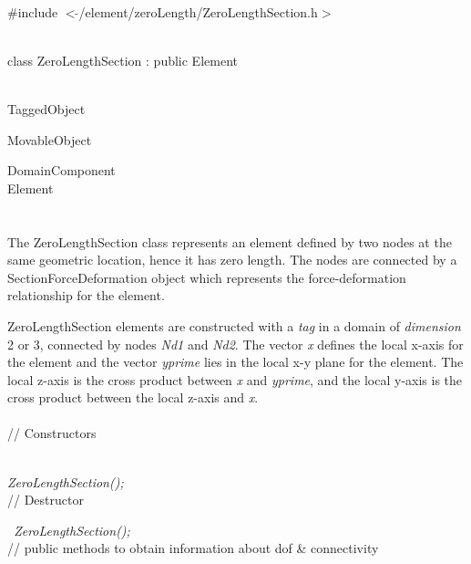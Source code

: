 
   \\
\#include $<\tilde{ }$/element/zeroLength/ZeroLengthSection.h$>$  


  \\
class ZeroLengthSection : public Element 


 \\
TaggedObject 

MovableObject 

\indent\indent DomainComponent \\
\indent\indent\indent Element \\
\indent\indent\indent{} \\

  \\
\indent 
The ZeroLengthSection class represents an element defined by two nodes at the same geometric
location, hence it has zero length.
The nodes are connected by a SectionForceDeformation object which
represents the force-deformation relationship for the element. 

ZeroLengthSection elements are constructed with a {\em tag} in a domain of {\em dimension} 2 or 3,
connected by nodes {\em Nd1} and {\em Nd2}. 
The vector {\em x} defines the local x-axis for the element and the vector {\em yprime}
lies in the local x-y plane for the element.  The local z-axis is the cross product between 
{\em x} and {\em yprime}, and the local y-axis is the cross product between the local z-axis
and {\em x}.
\\

 \\
// Constructors 

 \\
{\em    ZeroLengthSection();} \\ 

// Destructor 

{\em    ~ZeroLengthSection();} \\ 

   // public methods to obtain information about dof \& connectivity 

